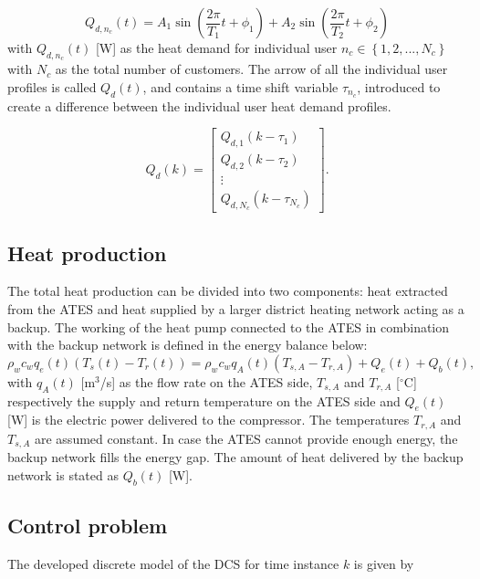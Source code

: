 \begin{equation}
Q_{d,n_c}(t)=A_1 \sin(\frac{2 \pi}{T_1} t + \phi_1) + A_2\sin(\frac{2 \pi}{T_2} t + \phi_2)
\end{equation}
with $Q_{d,n_c}(t)$ [W] as the heat demand for individual user $n_c \in \left\{1,2,...,N_c \right\}$ with $N_c$ as the total number of customers. The arrow of all the individual user profiles is called $Q_d(t)$, and contains a time shift variable $\tau_{n_c}$, introduced to create a difference between the individual user heat demand profiles.

\begin{equation}
Q_d(k) = 
\left[\begin{array}{c}
Q_{d,1}(k-\tau_1) \\
Q_{d,2}(k-\tau_2) \\
\vdots \\
Q_{d,N_c}(k - \tau_{N_c})
\end{array}\right].
\end{equation}

\subsection{Heat production}
The total heat production can be divided into two components: heat extracted from the ATES and heat supplied by a larger district heating network acting as a backup. The working of the heat pump connected to the ATES in combination with the backup network is defined in the energy balance below:
\begin{equation}
    \rho_w c_w q_e(t) \left(T_s(t) - T_r(t)\right) = \rho_w c_w q_{A}(t)\left(T_{s,A} - T_{r,A}\right) + Q_e(t) + Q_{b}(t),
\end{equation}
with $q_A(t)$ [m$^3$/s] as the flow rate on the ATES side, $T_{s,A}$ and $T_{r,A}$ [$^{\circ}\text{C}$] respectively the supply and return temperature on the ATES side and $Q_e(t)$ [W] is the electric power delivered to the compressor. The temperatures $T_{r,A}$ and $T_{s,A}$ are assumed constant. In case the ATES cannot provide enough energy, the backup network fills the energy gap. The amount of heat delivered by the backup network is stated as $Q_{b}(t)$ [W].

\subsection{Control problem}
The developed discrete model of the DCS for time instance $k$ is given by

